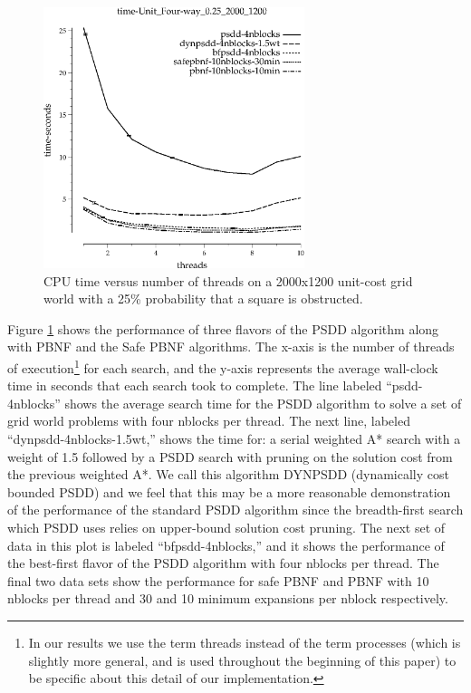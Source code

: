 \documentclass{article}
\begin{document}
\begin{figure}[t]
\includegraphics[width=3in]{../graphs/grid_unit_four-way_0.25_2000_1200/time-Unit_Four-way_0.25_2000_1200.eps}
\caption{CPU time versus number of threads on a 2000x1200 unit-cost
  grid world with a 25\% probability that a square is obstructed.}
\label{fig:grid-unit}
\end{figure}

Figure \ref{fig:grid-unit} shows the performance of three flavors of
the PSDD algorithm along with PBNF and the Safe PBNF algorithms.  The
x-axis is the number of threads of execution\footnote{In our results
  we use the term threads instead of the term processes (which is
  slightly more general, and is used throughout the beginning of this
  paper) to be specific about this detail of our implementation.} for
each search, and the y-axis represents the average wall-clock time in
seconds that each search took to complete. The line labeled
``psdd-4nblocks'' shows the average search time for the PSDD algorithm
to solve a set of grid world problems with four nblocks per thread.
The next line, labeled ``dynpsdd-4nblocks-1.5wt,'' shows the time for:
a serial weighted A* search with a weight of 1.5 followed by a PSDD
search with pruning on the solution cost from the previous weighted
A*.  We call this algorithm DYNPSDD (dynamically cost bounded PSDD)
and we feel that this may be a more reasonable demonstration of the
performance of the standard PSDD algorithm since the breadth-first
search which PSDD uses relies on upper-bound solution cost pruning.
The next set of data in this plot is labeled ``bfpsdd-4nblocks,'' and
it shows the performance of the best-first flavor of the PSDD
algorithm with four nblocks per thread.  The final two data sets show
the performance for safe PBNF and PBNF with 10 nblocks per thread and
30 and 10 minimum expansions per nblock respectively.
\end{document}
